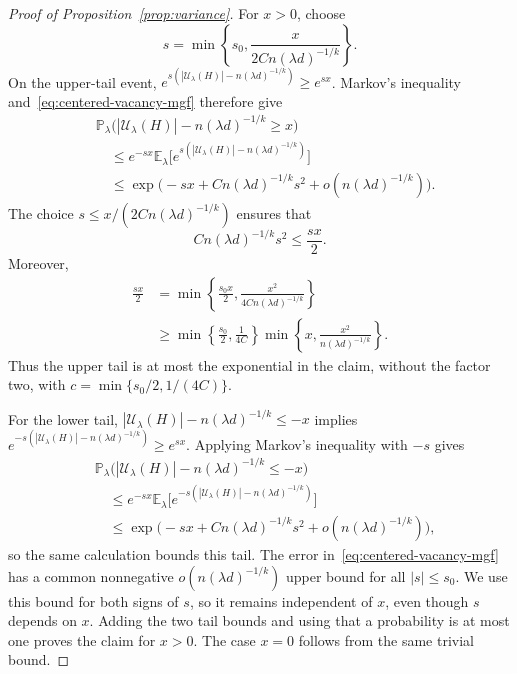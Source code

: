 \documentclass[11pt,reqno]{amsart}
\makeatletter
\numberwithin{equation}{section}
\theoremstyle{plain}
\newenvironment{claimproof}[1][Proof]{\par
    \pushQED{\qed}%
    \renewcommand{\qedsymbol}{$\blacksquare$}
    \normalfont \topsep6\p@\@plus6\p@\relax
    \trivlist
    \item[\hskip\labelsep
    \textit{#1}\@addpunct{.}~]\ignorespaces
}{%
    \popQED\endtrivlist\@endpefalse
}
\theoremstyle{definition}
\newcommand{\E}{\mathbb E}
\newcommand{\Prob}{\mathbb P}
\newcommand{\calU}{\mathcal U}
\makeatother
\begin{document}
\begin{proof}[Proof of Proposition~\ref{prop:variance}]
\begin{claimproof}[Proof of Claim~\ref{clm:vacancy-tails}]
        For $x>0$, choose
        \[
            s=\min\left\{s_0,\frac{x}{2Cn(\lambda d)^{-1/k}}\right\}.
        \]
        On the upper-tail event, $e^{s(|\calU_\lambda(H)|-n(\lambda d)^{-1/k})}\ge e^{sx}$.
        Markov's inequality and~\eqref{eq:centered-vacancy-mgf} therefore give
        \[
            \begin{aligned}
                &\Prob_\lambda\bigl(|\calU_\lambda(H)|-n(\lambda d)^{-1/k}\ge x\bigr)\\
                &\quad\le e^{-sx}\E_\lambda\bigl[e^{s(|\calU_\lambda(H)|-n(\lambda d)^{-1/k})}\bigr]\\
                &\quad\le\exp\bigl(-sx+Cn(\lambda d)^{-1/k}s^2+o(n(\lambda d)^{-1/k})\bigr).
            \end{aligned}
        \]
        The choice $s\le x/(2Cn(\lambda d)^{-1/k})$ ensures that
        \[
            Cn(\lambda d)^{-1/k}s^2\le\frac{sx}{2}.
        \]
        Moreover,
        \[
            \begin{aligned}
                \frac{sx}{2}
                &=\min\left\{\frac{s_0x}{2},\frac{x^2}{4Cn(\lambda d)^{-1/k}}\right\}\\
                &\ge\min\left\{\frac{s_0}{2},\frac1{4C}\right\}
                \min\left\{x,\frac{x^2}{n(\lambda d)^{-1/k}}\right\}.
            \end{aligned}
        \]
        Thus the upper tail is at most the exponential in the claim, without the factor two, with $c=\min\{s_0/2,1/(4C)\}$.

        For the lower tail, $|\calU_\lambda(H)|-n(\lambda d)^{-1/k}\le-x$ implies
        $e^{-s(|\calU_\lambda(H)|-n(\lambda d)^{-1/k})}\ge e^{sx}$.
        Applying Markov's inequality with $-s$ gives
        \[
            \begin{aligned}
                &\Prob_\lambda\bigl(|\calU_\lambda(H)|-n(\lambda d)^{-1/k}\le-x\bigr)\\
                &\quad\le e^{-sx}\E_\lambda\bigl[e^{-s(|\calU_\lambda(H)|-n(\lambda d)^{-1/k})}\bigr]\\
                &\quad\le\exp\bigl(-sx+Cn(\lambda d)^{-1/k}s^2+o(n(\lambda d)^{-1/k})\bigr),
            \end{aligned}
        \]
        so the same calculation bounds this tail.
        The error in~\eqref{eq:centered-vacancy-mgf} has a common nonnegative $o(n(\lambda d)^{-1/k})$ upper bound for all $|s|\le s_0$.
        We use this bound for both signs of $s$, so it remains independent of $x$, even though $s$ depends on $x$.
        Adding the two tail bounds and using that a probability is at most one proves the claim for $x>0$.
        The case $x=0$ follows from the same trivial bound.
    \end{claimproof}


\end{proof}
\end{document}
